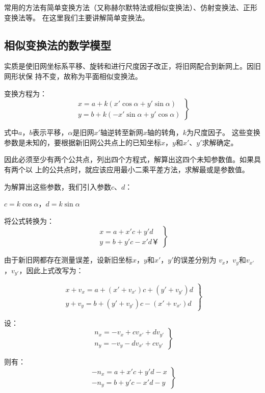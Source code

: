常用的方法有简单变换方法（又称赫尔默特法或相似变换法）、仿射变换法、正形变换法等。
在这里我们主要讲解简单变换法。

\subsection{相似变换法的数学模型}
实质是使旧网坐标系平移、旋转和进行尺度因子改正，将旧网配合到新网上。因旧网形状保
持不变，故称为平面相似变换法。

变换方程为：
$$\left.
\begin{array}{l}
\textrm{$x=a+k(x'\cos\alpha+y'\sin\alpha)$} \\
\textrm{$y=b+k(-x'\sin\alpha+y'\cos\alpha)$}
\end{array}\right\}$$

式中$a$，$b$表示平移，$\alpha$是旧网$x'$轴逆转至新网$x$轴的转角，$k$为尺度因子。
这些变换参数是未知的，要根据新旧网公共点上的已知坐标$x$，$y$和$x'$、$y'$求解确定。

因此必须至少有两个公共点，列出四个方程式，解算出这四个未知参数值。如果具有两个以
上的公共点时，就应该应用最小二乘平差方法，求解最或是参数值。

为解算出这些参数，我们引入参数$c$、$d$：

$c=k\cos\alpha$，$d=k\sin\alpha$

将公式转换为：
$$\left.
\begin{array}{l}
\textrm{$x=a+x'c+y'd$}\\
\textrm{$y=b+y'c-x'd￥$}
\end{array}\right\}$$

由于新旧网都存在测量误差，设新旧坐标$x$，$y$和$x'$，$y'$的误差分别为
$v_x$，$v_y$和$v_{x'}$，$v_{y'}$，因此上式改写为：

$$\left.\begin{array}{l}
\textrm{$x+v_x=a+(x'+v_{x'})c+(y'+v_{y'})d$} \\
\textrm{$y+v_y=b+(y'+v_{y'})c-(x'+v_{x'})d$}
\end{array}\right\}$$

设：
$$\left.\begin{array}{l}
\textrm{$n_x=-v_x+cv_{x'}+dv_{y'}$} \\
\textrm{$n_y=-v_y-dv_{x'}+cv_{y'}$}
\end{array}\right\}$$

则有：
$$\left.\begin{array}{l}
\textrm{$-n_x=a+x'c+y'd-x$} \\
\textrm{$-n_y=b+y'c-x'd-y$}
\end{array}\right\}$$

